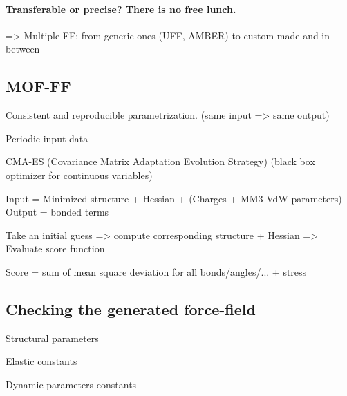 \documentclass[thesis]{subfiles}
\begin{document}
\paragraph{Transferable or precise? There is no free lunch.}

=> Multiple FF: from generic ones (UFF, AMBER) to custom made and in-between

\subsection{MOF-FF}

Consistent and reproducible parametrization. (same input => same output)

Periodic input data

CMA-ES (Covariance Matrix Adaptation Evolution Strategy) (black box optimizer
for continuous variables)

Input = Minimized structure + Hessian + (Charges + MM3-VdW parameters)
Output = bonded terms

Take an initial guess => compute corresponding structure + Hessian => Evaluate score function

Score = sum of mean square deviation for all bonds/angles/... + stress

\subsection{Checking the generated force-field}

Structural parameters

Elastic constants

Dynamic parameters constants

\OnlyInSubfile{\printbibliography}
\end{document}
